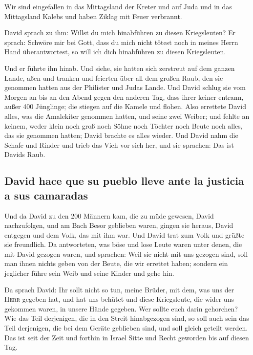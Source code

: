  Wir sind eingefallen in das Mittagsland der Kreter und
auf Juda und in das Mittagsland Kalebs und haben Ziklag mit Feuer
verbrannt.

 David sprach zu ihm: Willst du mich hinabführen zu
diesen Kriegsleuten? Er sprach: Schwöre mir bei Gott, dass du mich nicht
tötest noch in meines Herrn Hand überantwortest, so will ich dich
hinabführen zu diesen Kriegsleuten.

 Und er führte ihn hinab. Und siehe, sie hatten sich
zerstreut auf dem ganzen Lande, aßen und tranken und feierten über all
dem großen Raub, den sie genommen hatten aus der Philister und Judas
Lande.  Und David schlug sie vom Morgen an bis an den
Abend gegen den anderen Tag, dass ihrer keiner entrann, außer 400
Jünglinge; die stiegen auf die Kamele und flohen.  Also
errettete David alles, was die Amalekiter genommen hatten, und seine
zwei Weiber;  und fehlte an keinem, weder klein noch groß
noch Söhne noch Töchter noch Beute noch alles, das sie genommen hatten;
David brachte es alles wieder.  Und David nahm die Schafe
und Rinder und trieb das Vieh vor sich her, und sie sprachen: Das ist
Davids Raub.

\hypertarget{david-hace-que-su-pueblo-lleve-ante-la-justicia-a-sus-camaradas}{%
\subsection{David hace que su pueblo lleve ante la justicia a sus
camaradas}\label{david-hace-que-su-pueblo-lleve-ante-la-justicia-a-sus-camaradas}}

 Und da David zu den 200 Männern kam, die zu müde
gewesen, David nachzufolgen, und am Bach Besor geblieben waren, gingen
sie heraus, David entgegen und dem Volk, das mit ihm war. Und David trat
zum Volk und grüßte sie freundlich.  Da antworteten, was
böse und lose Leute waren unter denen, die mit David gezogen waren, und
sprachen: Weil sie nicht mit uns gezogen sind, soll man ihnen nichts
geben von der Beute, die wir errettet haben; sondern ein jeglicher führe
sein Weib und seine Kinder und gehe hin.

 Da sprach David: Ihr sollt nicht so tun, meine Brüder,
mit dem, was uns der \textsc{Herr} gegeben hat, und hat uns behütet und
diese Kriegsleute, die wider uns gekommen waren, in unsere Hände
gegeben.  Wer sollte euch darin gehorchen? Wie das Teil
derjenigen, die in den Streit hinabgezogen sind, so soll auch sein das
Teil derjenigen, die bei dem Geräte geblieben sind, und soll gleich
geteilt werden.  Das ist seit der Zeit und forthin in
Israel Sitte und Recht geworden bis auf diesen Tag.


